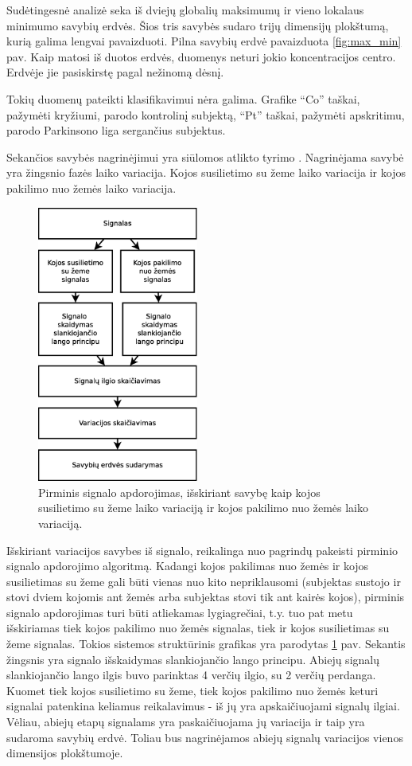 \documentclass[]{vgtuef}
\begin{document}
Sudėtingesnė analizė seka iš dviejų globalių maksimumų ir vieno lokalaus minimumo savybių erdvės. Šios tris savybės sudaro trijų dimensijų plokštumą, kurią galima lengvai pavaizduoti. Pilna savybių erdvė pavaizduota \ref{fig:max_min} pav. Kaip matosi iš duotos erdvės, duomenys neturi jokio koncentracijos centro. Erdvėje jie pasiskirstę pagal nežinomą dėsnį.

Tokių duomenų pateikti klasifikavimui nėra galima. Grafike ``Co'' taškai, pažymėti kryžiumi, parodo kontrolinį subjektą, ``Pt'' taškai, pažymėti apskritimu, parodo Parkinsono liga sergančius subjektus.

Sekančios savybės nagrinėjimui yra siūlomos atlikto tyrimo \cite{16053531}. Nagrinėjama savybė yra žingsnio fazės laiko variacija. Kojos susilietimo su žeme laiko variacija ir kojos pakilimo nuo žemės laiko variacija.

\begin{figure}[!t]
  \centering
  \includegraphics[width=200px]{figures/pirminis_signalo_apdorojimas_skaiciuojant_variacija.eps}
  \caption{Pirminis signalo apdorojimas, išskiriant savybę kaip kojos
    susilietimo su žeme laiko variaciją ir kojos pakilimo nuo žemės
    laiko variaciją.}
  \label{fig:stance_swing_extract}
\end{figure}

Išskiriant variacijos savybes iš signalo, reikalinga nuo pagrindų pakeisti pirminio signalo apdorojimo algoritmą. Kadangi kojos pakilimas nuo žemės ir kojos susilietimas su žeme gali būti vienas nuo kito nepriklausomi (subjektas sustojo ir stovi dviem kojomis ant žemės arba subjektas stovi tik ant kairės kojos), pirminis signalo apdorojimas turi būti atliekamas lygiagrečiai, t.y. tuo pat metu išskiriamas tiek kojos pakilimo nuo žemės signalas, tiek ir kojos susilietimas su žeme signalas. Tokios sistemos struktūrinis grafikas yra parodytas \ref{fig:stance_swing_extract} pav. Sekantis žingsnis yra signalo išskaidymas slankiojančio lango principu. Abiejų signalų slankiojančio lango ilgis buvo parinktas 4 verčių ilgio, su 2 verčių perdanga. Kuomet tiek kojos susilietimo su žeme, tiek kojos pakilimo nuo žemės keturi signalai patenkina keliamus reikalavimus - iš jų yra apskaičiuojami signalų ilgiai. Vėliau, abiejų etapų signalams yra paskaičiuojama jų variacija ir taip yra sudaroma savybių erdvė. Toliau bus nagrinėjamos abiejų signalų variacijos vienos dimensijos plokštumoje.
\end{document}
